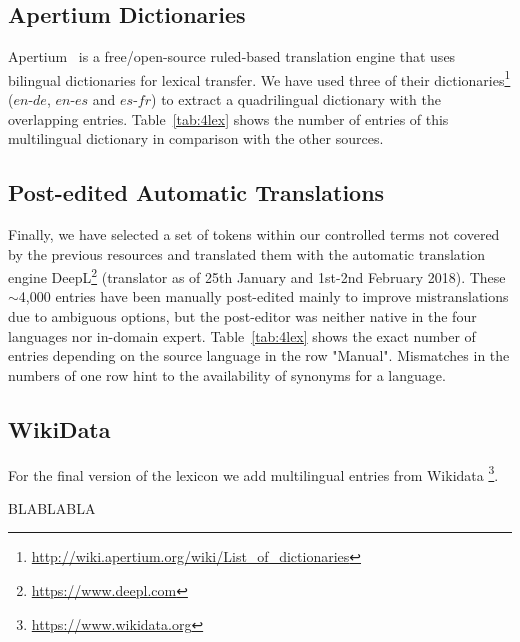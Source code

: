 \documentclass[a4paper,11pt]{article}
\begin{document}
	
	\subsection{Apertium Dictionaries}
	\label{ss:apertium}
	
	Apertium~\cite{forcadaEtal:2011} is a free/open-source ruled-based translation engine that uses bilingual dictionaries for lexical transfer. We have used three of their dictionaries\footnote{\url{http://wiki.apertium.org/wiki/List_of_dictionaries}} ($en$-$de$, $en$-$es$ and $es$-$fr$) to extract a quadrilingual dictionary with the overlapping entries. Table~\ref{tab:4lex} shows the number of entries of this multilingual dictionary in comparison with the other sources.
	
	\subsection{Post-edited Automatic Translations}
	\label{ss:manual}
	
	Finally, we have selected a set of tokens within our controlled terms not covered by the previous resources and translated them with the automatic translation engine DeepL\footnote{\url{https://www.deepl.com}}  (translator as of 25th January and 1st-2nd February 2018). These $\sim$4,000 entries have been manually post-edited  mainly to improve mistranslations due to ambiguous options, but the post-editor was neither native in the four languages nor in-domain expert. Table~\ref{tab:4lex} shows the exact number of entries depending on the source language in the row "Manual". Mismatches in the numbers of one row hint to the availability of synonyms for a language.

	\subsection{WikiData}
	\label{ss:wikidata}
	
	For the final version of the lexicon we add multilingual entries from Wikidata%
	\footnote{\url{https://www.wikidata.org}}.
	
	BLABLABLA
	
\end{document}
